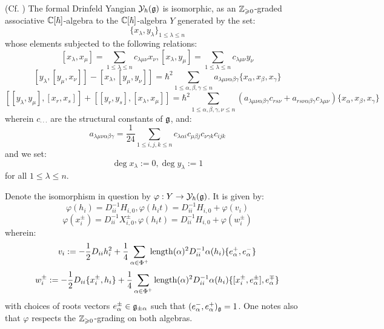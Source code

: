         \begin{theorem} \label{theorem: drinfeld_current_presentation}
            (Cf. \cite[Theorem 12.1.3]{chari_pressley_quantum_groups}) The formal Drinfeld Yangian $\mathcal{Y}_{\hbar}(\mathfrak{g})$ is isomorphic, as an $\mathbb{Z}_{\geqslant 0}$-graded associative $\mathbb{C}[\hbar]$-algebra to the $\mathbb{C}[\hbar]$-algebra $Y$ generated by the set:
                $$\{ x_{\lambda}, y_{\lambda} \}_{1 \leq \lambda \leq n}$$
            whose elements subjected to the following relations:
                $$[ x_{\lambda}, x_{\mu} ] = \sum_{1 \leq \lambda \leq n} c_{\lambda \mu \nu} x_{\nu}, [ x_{\lambda}, y_{\mu} ] = \sum_{1 \leq \lambda \leq n} c_{\lambda \mu \nu} y_{\nu}$$
                $$[ y_{\lambda}, [y_{\mu}, x_{\nu}] ] - [ x_{\lambda}, [y_{\mu}, y_{\nu}] ] = \hbar^2 \sum_{1 \leq \alpha, \beta, \gamma \leq n} a_{\lambda \mu \nu \alpha \beta \gamma} \{ x_{\alpha}, x_{\beta}, x_{\gamma} \}$$
                $$[ [y_{\lambda}, y_{\mu}], [x_r, x_s] ] + [ [y_r, y_s], [x_{\lambda}, x_{\mu}] ] = \hbar^2 \sum_{1 \leq \alpha, \beta, \gamma, \nu \leq n} ( a_{\lambda \mu \nu \alpha \beta \gamma} c_{r s \nu} + a_{r s \nu \alpha \beta \gamma} c_{\lambda \mu \nu} ) \{ x_{\alpha}, x_{\beta}, x_{\gamma} \}$$
            wherein $c_{\cdot \cdot \cdot}$ are the structural constants of $\mathfrak{g}$, and:
                $$a_{\lambda \mu \nu \alpha \beta \gamma} = \frac{1}{24} \sum_{1 \leq i, j, k \leq n} c_{\lambda \alpha i} c_{\mu \beta j} c_{\nu \gamma k} c_{i j k}$$
            and we set:
                $$\deg x_{\lambda} := 0, \deg y_{\lambda} := 1$$
            for all $1 \leq \lambda \leq n$.
            
            Denote the isomorphism in question by $\varphi: Y \to \mathcal{Y}_{\hbar}(\mathfrak{g})$. It is given by:
                $$\varphi(h_i) = D_{ii}^{-1} H_{i, 0}, \varphi(h_i t) = D_{ii}^{-1} H_{i, 0} + \varphi(v_i)$$
                $$\varphi(x_i^{\pm}) = D_{ii}^{-1} X_{i, 0}^{\pm}, \varphi(h_i t) = D_{ii}^{-1} H_{i, 0} + \varphi(w_i^{\pm})$$
            wherein:
                $$v_i := -\frac12 D_{ii} h_i^2 + \frac14 \sum_{\alpha \in \Phi^+} \operatorname{length}(\alpha)^2 D_{ii}^{-1} \alpha(h_i) \{e_{\alpha}^+, e_{\alpha}^-\}$$
                $$w_i^{\pm} := -\frac12 D_{ii} \{x_i^{\pm}, h_i\} + \frac14 \sum_{\alpha \in \Phi^+} \operatorname{length}(\alpha)^2 D_{ii}^{-1} \alpha(h_i) \{[x_i^{\pm}, e_{\alpha}^{\pm}], e_{\alpha}^{\mp}\}$$
            with choices of roots vectors $e_{\alpha}^{\pm} \in \mathfrak{g}_{\pm \alpha}$ such that $(e_{\alpha}^-, e_{\alpha}^+)_{\mathfrak{g}} = 1$. One notes also that $\varphi$ respects the $\mathbb{Z}_{\geqslant 0}$-grading on both algebras.
        \end{theorem}

